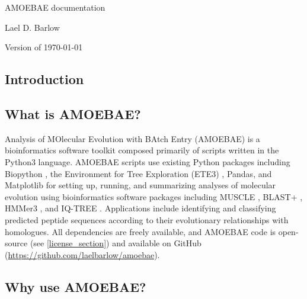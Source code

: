 \documentclass[12pt,letterpaper]{article}
\begin{document}
\begin{titlepage}
	\centering
    {\huge AMOEBAE documentation\par}
	\vspace{2cm}
    {\Large Lael D. Barlow\par}
	\vfill
	{\large Version of \today\par}
\end{titlepage}

\newpage
\tableofcontents

\newpage
{}
\begin{linenumbers}

\section{Introduction}


\subsection{What is AMOEBAE?}

Analysis of MOlecular Evolution with BAtch Entry (AMOEBAE) is a bioinformatics
    software toolkit composed primarily of scripts written in the Python3
    language. AMOEBAE scripts use existing Python packages including Biopython
    \citep{cock2009}, the Environment for Tree Exploration (ETE3)
    \citep{huerta-cepas2016}, Pandas, and Matplotlib \citep{hunter2007} for
    setting up, running, and summarizing analyses of molecular evolution using
    bioinformatics software packages including MUSCLE \citep{edgar2004}, BLAST+
    \citep{camacho2009}, HMMer3 \citep{eddy1998}, and IQ-TREE
    \citep{nguyen2015}. Applications include identifying and classifying
    predicted peptide sequences according to their evolutionary relationships
    with homologues. All dependencies are freely available, and AMOEBAE code is
    open-source (see \autoref*{license_section}) and available on GitHub
    (\url{https://github.com/laelbarlow/amoebae}). 

\subsection{Why use AMOEBAE?}


\end{linenumbers}
\end{document}
